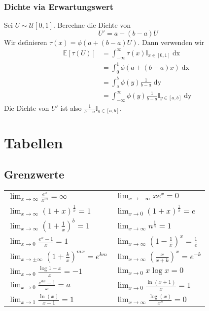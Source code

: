 \documentclass[a4paper,10pt]{article}
\def\limxo{\lim_{x\to 0}}
\def\limxi{\lim_{x\to\infty}}
\def\limxn{\lim_{x\to-\infty}}
\def\E{\mathbb{E}}
\begin{document}
\subsubsection*{Dichte via Erwartungswert}
Sei \(U \sim \mathcal{U}[0,1]\). Berechne die Dichte von
\[U' = a + (b-a)U\]
Wir definieren \(\tau(x) = \phi(a +(b-a)U)\). Dann verwenden wir
\begin{align*}
	\E[\tau(U)] & = \int_{-\infty}^\infty \tau(x) \mathbb{I}_{x\in [0,1]}\mathop{dx}              \\
	            & = \int_0^1 \phi(a + (b-a)x) \mathop{dx}                                         \\
	            & = \int_a^b \phi(y)\frac{1}{b-a} \mathop{dy}                                     \\
	            & = \int_{-\infty}^\infty \phi(y)\frac{1}{b-a} \mathbb{I}_{y\in[a,b]} \mathop{dy}
\end{align*}
Die Dichte von \(U'\) ist also \(\frac{1}{b-a} \mathbb{I}_{y\in[a,b]}\).

\clearpage
\section{Tabellen}

\subsection{Grenzwerte}
\begin{center}
	\begin{tabularx}{\linewidth}{XX}
		\toprule
		$\limxi \frac{e^x}{x^m} = \infty$                      & $\limxn xe^x = 0$                        \\
		$\limxi (1+x)^{\frac{1}{x}} = 1$                       & $\limxo (1+x)^{\frac{1}{x}} = e$         \\
		$\limxi (1+\frac{1}{x})^b = 1$                         & $\limxi n^{\frac{1}{n}} = 1$             \\
		$\limxo \frac{e^x-1}{x} = 1$                           & $\limxi (1-\frac{1}{x})^x = \frac{1}{e}$ \\
		$\lim_{x\to\pm\infty} (1 + \frac{k}{x})^{mx} = e^{km}$ & $\limxi (\frac{x}{x+k})^x = e^{-k}$      \\
		$\limxo \frac{\log 1 - x}{x} = -1$                     & $\limxo x \log x = 0$                    \\
		$\limxo \frac{e^{ax}-1}{x} = a$                        & $\limxo \frac{\ln(x+1)}{x} = 1$          \\
		$\lim_{x\to 1} \frac{\ln(x)}{x-1} = 1$                 & $\limxi \frac{\log(x)}{x^a} = 0$         \\
		\bottomrule
	\end{tabularx}
\end{center}
\end{document}
